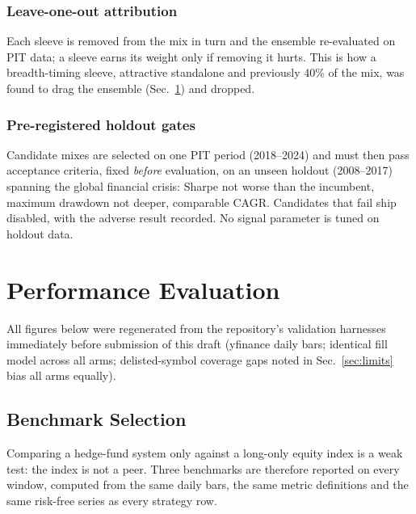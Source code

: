 \documentclass[10pt,twocolumn]{IEEEtran}
\begin{document}
\subsubsection{Leave-one-out attribution} Each sleeve is removed from the
mix in turn and the ensemble re-evaluated on PIT data; a sleeve earns its
weight only if removing it hurts. This is how a breadth-timing sleeve,
attractive standalone and previously 40\% of the mix, was found to drag
the ensemble (Sec.~\ref{sec:eval}) and dropped.

\subsubsection{Pre-registered holdout gates} Candidate mixes are selected on
one PIT period (2018--2024) and must then pass acceptance criteria,
fixed \emph{before} evaluation, on an unseen holdout (2008--2017)
spanning the global financial crisis: Sharpe not worse than the incumbent,
maximum drawdown not deeper, comparable CAGR. Candidates that fail ship
disabled, with the adverse result recorded. No signal parameter is tuned on
holdout data.

\section{Performance Evaluation}
\label{sec:eval}

All figures below were regenerated from the repository's validation
harnesses immediately before submission of this draft (yfinance daily bars;
identical fill model across all arms; delisted-symbol coverage gaps noted
in Sec.~\ref{sec:limits} bias all arms equally).

\subsection{Benchmark Selection}
\label{sec:benchmarks}

Comparing a hedge-fund system only against a long-only equity index is a weak
test: the index is not a peer. Three benchmarks are therefore reported on every
window, computed from the same daily bars, the same metric definitions and the
same risk-free series as every strategy row.
\end{document}
